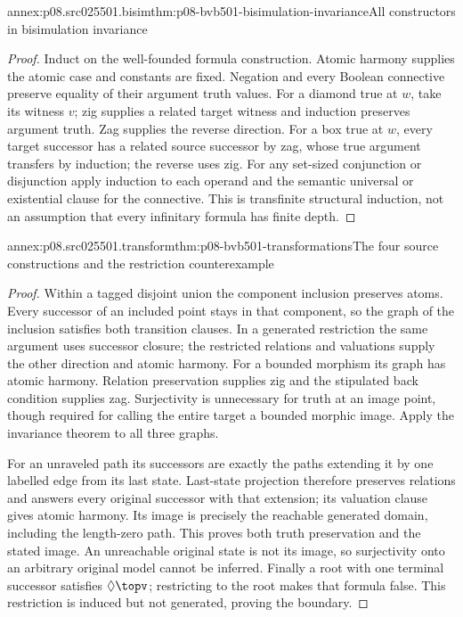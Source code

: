 \begin{annexitem}{annex:p08.src025501.bisim}{thm:p08-bvb501-bisimulation-invariance}{All constructors in bisimulation invariance}
\begin{proof}
Induct on the well-founded formula construction. Atomic harmony supplies
the atomic case and constants are fixed. Negation and every Boolean
connective preserve equality of their argument truth values. For a diamond
true at \(w\), take its witness \(v\); zig supplies a related target
witness and induction preserves argument truth. Zag supplies the reverse
direction. For a box true at \(w\), every target successor has a related
source successor by zag, whose true argument transfers by induction;
the reverse uses zig. For any set-sized conjunction or disjunction apply
induction to each operand and the semantic universal or existential clause
for the connective. This is transfinite structural induction, not an
assumption that every infinitary formula has finite depth.
\end{proof}
\end{annexitem}

\begin{annexitem}{annex:p08.src025501.transform}{thm:p08-bvb501-transformations}{The four source constructions and the restriction counterexample}
\begin{proof}
Within a tagged disjoint union the component inclusion preserves atoms.
Every successor of an included point stays in that component, so the graph
of the inclusion satisfies both transition clauses. In a generated
restriction the same argument uses successor closure; the restricted
relations and valuations supply the other direction and atomic harmony.
For a bounded morphism its graph has atomic harmony. Relation preservation
supplies zig and the stipulated back condition supplies zag. Surjectivity
is unnecessary for truth at an image point, though required for calling
the entire target a bounded morphic image. Apply the invariance theorem
to all three graphs.

For an unraveled path its successors are exactly the paths extending it
by one labelled edge from its last state. Last-state projection therefore
preserves relations and answers every original successor with that extension;
its valuation clause gives atomic harmony. Its image is precisely the
reachable generated domain, including the length-zero path. This proves
both truth preservation and the stated image. An unreachable original
state is not its image, so surjectivity onto an arbitrary original model
cannot be inferred. Finally a root with one terminal successor satisfies
\(\Diamond\topv\); restricting to the root makes that formula false.
This restriction is induced but not generated, proving the boundary.
\end{proof}
\end{annexitem}

